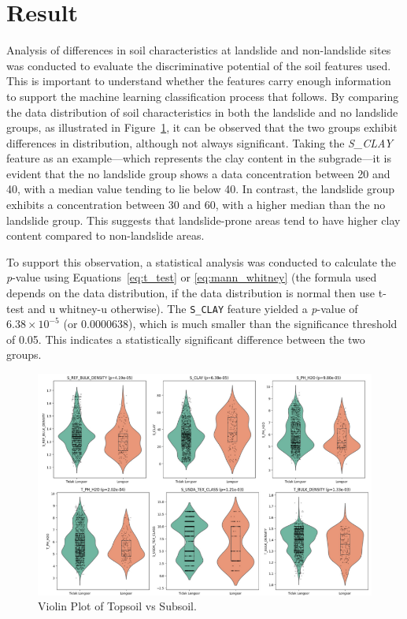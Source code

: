 \section{Result}
Analysis of differences in soil characteristics at landslide and non-landslide sites was conducted to evaluate the discriminative potential of the soil features used. This is important to understand whether the features carry enough information to support the machine learning classification process that follows. By comparing the data distribution of soil characteristics in both the landslide and no landslide groups, as illustrated in Figure~\ref{fig:Violin-plot}, it can be observed that the two groups exhibit differences in distribution, although not always significant. Taking the \textit{S\_CLAY} feature as an example—which represents the clay content in the subgrade—it is evident that the no landslide group shows a data concentration between 20 and 40, with a median value tending to lie below 40. In contrast, the landslide group exhibits a concentration between 30 and 60, with a higher median than the no landslide group. This suggests that landslide-prone areas tend to have higher clay content compared to non-landslide areas.

To support this observation, a statistical analysis was conducted to calculate the \textit{p}-value using Equations~\ref{eq:t_test} or \ref{eq:mann_whitney} (the formula used depends on the data distribution, if the data distribution is normal then use t-test and u whitney-u otherwise). The \texttt{S\_CLAY} feature yielded a \textit{p}-value of $6.38 \times 10^{-5}$ (or 0.0000638), which is much smaller than the significance threshold of 0.05. This indicates a statistically significant difference between the two groups.

\begin{figure}[htbp]
    \centerline{\includegraphics[width=\linewidth]{fig6.png}}
    \caption{Violin Plot of Topsoil vs Subsoil.}
    \label{fig:Violin-plot}
\end{figure}

